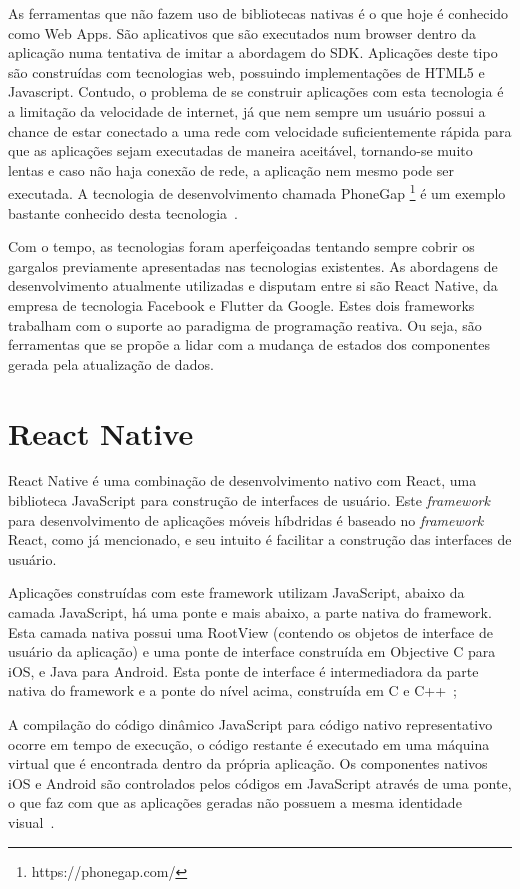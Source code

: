 As ferramentas que não fazem uso de bibliotecas nativas é o que hoje é conhecido como Web Apps.
São aplicativos que são executados num browser dentro da aplicação numa tentativa de imitar a abordagem do SDK. Aplicações deste tipo são construídas com tecnologias web, possuindo implementações de HTML5 e Javascript.
Contudo, o problema de se construir aplicações com esta tecnologia é a limitação da velocidade de internet, já que nem sempre um usuário possui a chance de estar conectado a uma rede com velocidade suficientemente rápida para que as aplicações sejam executadas de maneira aceitável, tornando-se muito lentas e caso não haja conexão de rede, a aplicação nem mesmo pode ser executada.
A tecnologia de desenvolvimento chamada PhoneGap \footnote{https://phonegap.com/} é um exemplo bastante conhecido desta tecnologia~\cite{clow2019flutter}.

Com o tempo, as tecnologias foram aperfeiçoadas tentando sempre cobrir os gargalos previamente apresentadas nas tecnologias existentes.
As abordagens de desenvolvimento atualmente utilizadas e disputam entre si são React Native, da empresa de tecnologia Facebook e Flutter da Google.
Estes dois frameworks trabalham com o suporte ao paradigma de programação reativa.
Ou seja, são ferramentas que se propõe a lidar com a mudança de estados dos componentes gerada pela atualização de dados\cite{lima2019avaliacao}.

\section{React Native}\label{sec:react-native}

React Native é uma combinação de desenvolvimento nativo com React, uma biblioteca JavaScript para construção de interfaces de usuário.
Este \textit{framework} para desenvolvimento de aplicações móveis híbdridas é baseado no \textit{framework} React, como já mencionado, e seu intuito é facilitar a construção das interfaces de usuário.

Aplicações construídas com este framework utilizam JavaScript, abaixo da camada JavaScript, há uma ponte e mais abaixo, a parte nativa do framework.
Esta camada nativa possui uma RootView (contendo os objetos de interface de usuário da aplicação) e uma ponte de interface construída em Objective C para iOS, e Java para Android.
Esta ponte de interface é intermediadora da parte nativa do framework e a ponte do nível acima, construída em C e C++~\cite{yatsenko2019comparative};

A compilação do código dinâmico JavaScript para código nativo representativo ocorre em tempo de execução, o código restante é executado em uma máquina virtual que é encontrada dentro da própria aplicação.
Os componentes nativos iOS e Android são controlados pelos códigos em JavaScript através de uma ponte, o que faz com que as aplicações geradas não possuem a mesma identidade visual~\cite{yatsenko2019comparative}.

